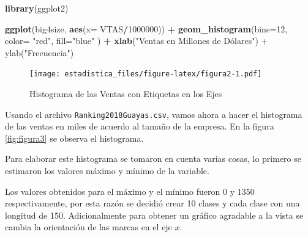 \documentclass[]{book}
\newenvironment{Shaded}{\begin{snugshade}}{\end{snugshade}}
\newcommand{\KeywordTok}[1]{\textcolor[rgb]{0.13,0.29,0.53}{\textbf{#1}}}
\newcommand{\DataTypeTok}[1]{\textcolor[rgb]{0.13,0.29,0.53}{#1}}
\newcommand{\DecValTok}[1]{\textcolor[rgb]{0.00,0.00,0.81}{#1}}
\newcommand{\StringTok}[1]{\textcolor[rgb]{0.31,0.60,0.02}{#1}}
\newcommand{\OperatorTok}[1]{\textcolor[rgb]{0.81,0.36,0.00}{\textbf{#1}}}
\newcommand{\NormalTok}[1]{#1}
\begin{document}
\begin{Shaded}
\begin{Highlighting}[]
\KeywordTok{library}\NormalTok{(ggplot2)}

\KeywordTok{ggplot}\NormalTok{(big4size, }\KeywordTok{aes}\NormalTok{(}\DataTypeTok{x=}\NormalTok{ VTAS}\OperatorTok{/}\DecValTok{1000000}\NormalTok{)) }\OperatorTok{+}\StringTok{ }
\StringTok{  }\KeywordTok{geom_histogram}\NormalTok{(}\DataTypeTok{bins=}\DecValTok{12}\NormalTok{, }\DataTypeTok{color=} \StringTok{"red"}\NormalTok{,  }\DataTypeTok{fill=}\StringTok{"blue"}\NormalTok{ ) }\OperatorTok{+}\StringTok{ }
\StringTok{  }\KeywordTok{xlab}\NormalTok{(}\StringTok{"Ventas en Millones de Dólares") + ylab("}\NormalTok{Frecuencia}\StringTok{")}
\end{Highlighting}
\end{Shaded}

\begin{figure}
\centering
\texttt{[image: estadistica\_files/figure-latex/figura2-1.pdf]}
\caption{\label{fig:figura2}Histograma de las Ventas con Etiquetas en los
Ejes}
\end{figure}

Usando el archivo \texttt{Ranking2018Guayas.csv}, vamos ahora a hacer el
histograma de las ventas en miles de acuerdo al tamaño de la empresa. En
la figura \ref{fig:figura3} se observa el histograma.

Para elaborar este histograma se tomaron en cuenta varias cosas, lo
primero se estimaron los valores máximo y mínimo de la variable.

\begin{Shaded}
\end{Shaded}

Los valores obtenidos para el máximo y el mínimo fueron \(0\) y \(1350\)
respectivamente, por esta razón se decidió crear 10 clases y cada clase
con una longitud de 150. Adicionalmente para obtener un gráfico
agradable a la vista se cambia la orientación de las marcas en el eje
\(x\).
\end{document}
